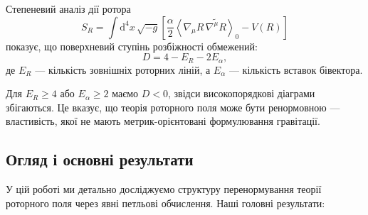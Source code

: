 \documentclass[11pt,a4paper]{article}
\numberwithin{equation}{section}
\theoremstyle{plain}
\theoremstyle{definition}
\theoremstyle{remark}
\newcommand{\dd}{\mathrm{d}}
\newcommand{\rev}[1]{\widetilde{#1}}        %
\newcommand{\grade}[2]{\left\langle #1 \right\rangle_{#2}}
\begin{document}
Степеневий аналіз дії ротора
\begin{equation}
S_R = \int \dd^4x\,\sqrt{-g}\left[\frac{\alpha}{2}\grade{\nabla_\mu R\,\rev{\nabla^\mu R}}{0} - V(R)\right]
\label{eq:action-rotor}
\end{equation}
показує, що поверхневий ступінь розбіжності обмежений:
\begin{equation}
D = 4 - E_R - 2E_\alpha,
\label{eq:power-counting}
\end{equation}
де $E_R$ — кількість зовнішніх роторних ліній, а $E_\alpha$ — кількість вставок бівектора.

Для $E_R\ge 4$ або $E_\alpha\ge 2$ маємо $D<0$, звідси високопорядкові діаграми збігаються. Це вказує, що теорія роторного поля може бути ренормовною — властивість, якої не мають метрик-орієнтовані формулювання гравітації.

\subsection{Огляд і основні результати}

У цій роботі ми детально досліджуємо структуру перенормування теорії роторного поля через явні петльові обчислення. Наші головні результати:
\end{document}
